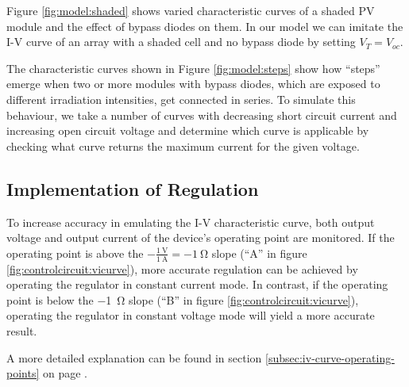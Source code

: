 Figure \ref{fig:model:shaded}  shows varied characteristic curves  of a shaded
PV  module and  the effect  of bypass  diodes on  them.  In  our model  we can
imitate the I-V  curve of an array with  a shaded cell and no  bypass diode by
setting $V_T = V_{oc}$.


The  characteristic  curves  shown  in  Figure  \ref{fig:model:steps}  show  how
``steps'' emerge when two or more modules  with bypass diodes, which are exposed
to different irradiation intensities, get  connected in series. To simulate this
behaviour, we take  a number of curves with decreasing short circuit current and
increasing  open  circuit  voltage  and  determine  which curve is applicable by
checking  what  curve  returns  the  maximum  current  for  the  given  voltage.


\subsection{Implementation of Regulation}
\label{subsec:regimplementation}

To increase  accuracy in emulating  the I-V characteristic curve,  both output
voltage and output current of the  device's operating point are monitored.  If
the  operating  point  is  above  the  $-\frac{\SI{1}{\volt}}{\SI{1}{\ampere}}
=  \SI{-1}{\ohm}$ slope  (``A''  in figure  \ref{fig:controlcircuit:vicurve}),
more  accurate  regulation can  be  achieved  by  operating the  regulator  in
constant  current  mode.   In  contrast,  if  the  operating  point  is  below
the  \SI{-1}{\ohm} slope  (``B'' in  figure \ref{fig:controlcircuit:vicurve}),
operating the  regulator in constant voltage  mode will yield a  more accurate
result.

A       more        detailed       explanation       can        be       found
in      section       \ref{subsec:iv-curve-operating-points}      on      page
\pageref{subsec:iv-curve-operating-points}.

